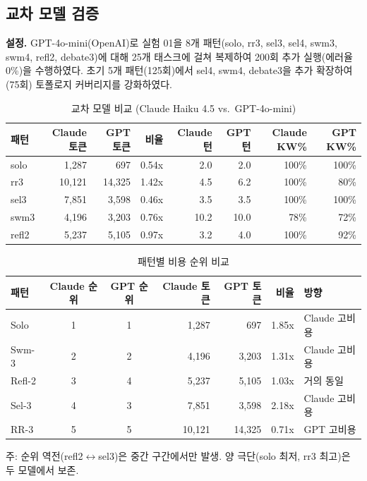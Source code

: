 \documentclass[a4paper,11pt]{article}
\begin{document}
\subsection{교차 모델 검증}
\label{sec:cross-model}

\textbf{설정.} GPT-4o-mini(OpenAI)로 실험 01을 8개 패턴(solo, rr3, sel3, sel4, swm3, swm4, refl2, debate3)에 대해 25개 태스크에 걸쳐 복제하여 200회 추가 실행(에러율 0\%)을 수행하였다. 초기 5개 패턴(125회)에서 sel4, swm4, debate3을 추가 확장하여(75회) 토폴로지 커버리지를 강화하였다.

\begin{table}[H]
\centering
\caption{교차 모델 비교 (Claude Haiku 4.5 vs.\ GPT-4o-mini)}
\label{tab:cross-model-tokens}
{\small
\begin{tabular}{lrrrrrrr}
\toprule
패턴 & Claude 토큰 & GPT 토큰 & 비율 & Claude 턴 & GPT 턴 & Claude KW\% & GPT KW\% \\
\midrule
solo  & 1,287  & 697    & 0.54x & 2.0  & 2.0  & 100\% & 100\% \\
rr3   & 10,121 & 14,325 & 1.42x & 4.5  & 6.2  & 100\% & 80\% \\
sel3  & 7,851  & 3,598  & 0.46x & 3.5  & 3.5  & 100\% & 100\% \\
swm3  & 4,196  & 3,203  & 0.76x & 10.2 & 10.0 & 78\%  & 72\% \\
refl2 & 5,237  & 5,105  & 0.97x & 3.2  & 4.0  & 100\% & 92\% \\
\bottomrule
\end{tabular}
}
\end{table}

\begin{table}[H]
\centering
\caption{패턴별 비용 순위 비교}
\label{tab:cross-model-rank}
{\small
\begin{tabular}{lccrrrl}
\toprule
패턴 & Claude 순위 & GPT 순위 & Claude 토큰 & GPT 토큰 & 비율 & 방향 \\
\midrule
Solo  & 1 & 1 & 1,287  & 697    & 1.85x & Claude 고비용 \\
Swm-3 & 2 & 2 & 4,196  & 3,203  & 1.31x & Claude 고비용 \\
Refl-2 & 3 & 4 & 5,237 & 5,105  & 1.03x & 거의 동일 \\
Sel-3 & 4 & 3 & 7,851  & 3,598  & 2.18x & Claude 고비용 \\
RR-3  & 5 & 5 & 10,121 & 14,325 & 0.71x & GPT 고비용 \\
\bottomrule
\end{tabular}
}

\smallskip
{\footnotesize 주: 순위 역전(refl2$\leftrightarrow$sel3)은 중간 구간에서만 발생. 양 극단(solo 최저, rr3 최고)은 두 모델에서 보존.}
\end{table}
\end{document}
